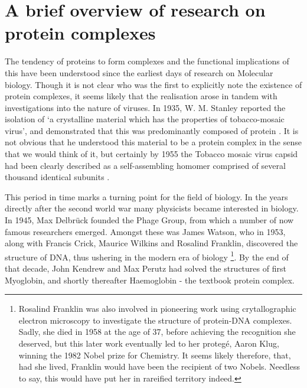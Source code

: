 \documentclass[a4paper,11pt,twoside,openright]{scrbook}
\let\cite\supercite
\begin{document}
\section{A brief overview of research on protein complexes}
The tendency of proteins to form complexes and the functional implications of this have been understood since the earliest days of research on Molecular biology. Though it is not clear who was the first to explicitly note the existence of protein complexes, it seems likely that the realisation arose in tandem with investigations into the nature of viruses. In 1935, W. M. Stanley reported the isolation of `a crystalline material which has the properties of tobacco-mosaic virus', and demonstrated that this was predominantly composed of protein \cite{Stanley1935}. It is not obvious that he understood this material to be a protein complex in the sense that we would think of it, but certainly by 1955 the Tobacco mosaic virus capsid had been clearly described as a self-assembling homomer comprised of several thousand identical subunits \cite{Fraenkel-Conrat1955}.

This period in time marks a turning point for the field of biology. In the years directly after the second world war many physicists became interested in biology. In 1945, Max Delbr{\"u}ck founded the Phage Group, from which a number of now famous researchers emerged. Amongst these was James Watson, who in 1953, along with Francis Crick, Maurice Wilkins and Rosalind Franklin, discovered the structure of DNA, thus ushering in the modern era of biology \footnote{ Rosalind Franklin was also involved in pioneering work using crytallographic electron microscopy to investigate the structure of protein-DNA complexes. Sadly, she died in 1958 at the age of 37, before achieving the recognition she deserved, but this later work eventually led to her proteg{\'e},  Aaron Klug, winning the 1982 Nobel prize for Chemistry. It seems likely therefore, that, had she lived, Franklin would have been the recipient of two Nobels. Needless to say, this would have put her in rareified territory indeed.}. By the end of that decade, John Kendrew and Max Perutz had solved the structures of first Myoglobin, and shortly thereafter Haemoglobin \cite{Perutz} - the textbook protein complex.
\end{document}
